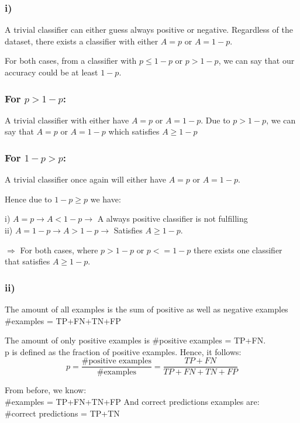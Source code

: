 \begin{answer}

\subsubsection*{i)} 
A trivial classifier can either guess always positive or negative. Regardless of the dataset, there exists a classifier with either $A=p$ or $A=1-p$. 

For both cases, from a classifier with $p \le 1-p$ or $p > 1-p$, we can say that our accuracy could be at least $1-p$.


\subsubsection*{For $p > 1-p$:}
A trivial classifier with either have $A=p$ or $A=1-p$.
Due to $p>1-p$, we can say that $A=p$ or $A=1-p$ which satisfies $A \ge 1-p$

\subsubsection*{For $1-p > p$:}
A trivial classifier once again will either have $A=p$ or $A=1-p$.

Hence due to $1-p \ge p$ we have:

    i) $A=p \rightarrow A < 1-p \rightarrow$ A always positive classifier is not fulfilling \\
    ii) $A=1-p \rightarrow A > 1-p \rightarrow$ Satisfies $A \ge 1-p$.

$\Rightarrow$ For both cases, where $p>1-p$ or $p<=1-p$ there exists one classifier that satisfies $A \ge 1-p$.


\subsubsection*{ii)} The amount of all examples is the sum of positive as well as negative examples
\#examples = TP+FN+TN+FP

The amount of only positive examples is \#positive examples = TP+FN. \\
p is defined as the fraction of positive examples. Hence, it follows:
\[ p = \frac{\#\text{positive examples}}{\#\text{examples}} = \frac{TP+FN}{TP+FN+TN+FP} \]


From before, we know: \\
\#examples = TP+FN+TN+FP
And correct predictions examples are: \\
\#correct predictions = TP+TN


\end{answer}
